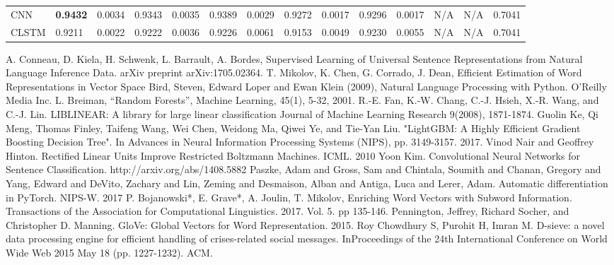 \documentclass[unicode, 12pt, a4paper,oneside]{article}
\begin{document}
\begin{table}[]
\begin{adjustbox}{width=\textwidth}
\begin{tabular}{@{}|l|lllllllllllll@{}}
\cmidrule(r){1-1}
CNN & {\bf 0.9432} &0.0034 &0.9343 &0.0035 & 0.9389 &0.0029 & 0.9272 &0.0017 & 0.9296 &0.0017 &N/A &N/A & 0.7041 \\
\cmidrule(r){1-1}
CLSTM & 0.9211 & 0.0022 & 0.9222 & 0.0036& 0.9226&0.0061& 0.9153& 0.0049&0.9230&0.0055&N/A&N/A& 0.7041 \\
\bottomrule
\end{tabular}
\end{adjustbox}
\end{table}


	
	\begin{thebibliography}{10}
		
		 A. Conneau, D. Kiela, H. Schwenk, L. Barrault, A. Bordes, Supervised Learning of Universal Sentence Representations from Natural Language Inference Data. arXiv preprint arXiv:1705.02364.
		 T. Mikolov, K. Chen, G. Corrado, J. Dean, Efficient Estimation of Word Representations in Vector Space
		 Bird, Steven, Edward Loper and Ewan Klein (2009), Natural Language Processing with Python. O’Reilly Media Inc.
		 L. Breiman, “Random Forests”, Machine Learning, 45(1), 5-32, 2001.
		 R.-E. Fan, K.-W. Chang, C.-J. Hsieh, X.-R. Wang, and C.-J. Lin. LIBLINEAR: A library for large linear classification Journal of Machine Learning Research 9(2008), 1871-1874.
		 Guolin Ke, Qi Meng, Thomas Finley, Taifeng Wang, Wei Chen, Weidong Ma, Qiwei Ye, and Tie-Yan Liu. "LightGBM: A Highly Efficient Gradient Boosting Decision Tree". In Advances in Neural Information Processing Systems (NIPS), pp. 3149-3157. 2017.
		 Vinod Nair and Geoffrey Hinton. Rectified Linear Units Improve Restricted Boltzmann Machines. ICML. 2010
		 Yoon Kim. Convolutional Neural Networks for Sentence Classification. http://arxiv.org/abs/1408.5882
		 Paszke, Adam and Gross, Sam and Chintala, Soumith and Chanan, Gregory and Yang, Edward and DeVito, Zachary and Lin, Zeming and Desmaison, Alban and Antiga, Luca and Lerer, Adam. Automatic differentiation in PyTorch. NIPS-W. 2017
		 P. Bojanowski*, E. Grave*, A. Joulin, T. Mikolov, Enriching Word Vectors with Subword Information. Transactions of the Association for Computational Linguistics. 2017. Vol. 5. pp 135-146.
		 Pennington, Jeffrey, Richard Socher, and Christopher D. Manning. GloVe: Global Vectors for Word Representation. 2015.
		 Roy Chowdhury S, Purohit H, Imran M. D-sieve: a novel data processing engine for efficient handling of crises-related social messages. InProceedings of the 24th International Conference on World Wide Web 2015 May 18 (pp. 1227-1232). ACM.

\end{thebibliography}
\end{document}
